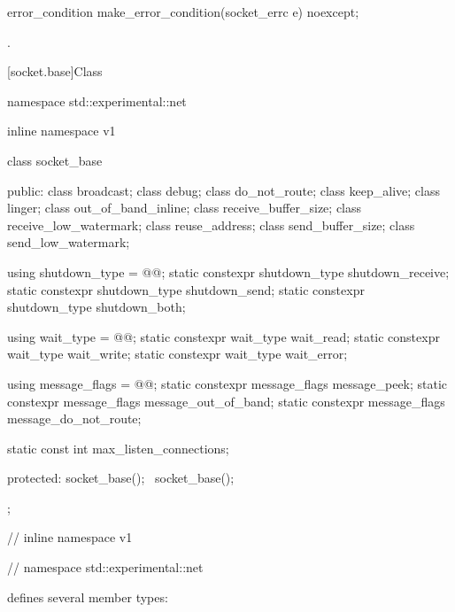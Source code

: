 %
%
\begin{itemdecl}
error_condition make_error_condition(socket_errc e) noexcept;
\end{itemdecl}

\begin{itemdescr}
\pnum
\returns {}.
\end{itemdescr}



%
[socket.base]{Class }

\begin{codeblock}
namespace std::experimental::net {
inline namespace v1 {

  class socket_base
  {
  public:
    class broadcast;
    class debug;
    class do_not_route;
    class keep_alive;
    class linger;
    class out_of_band_inline;
    class receive_buffer_size;
    class receive_low_watermark;
    class reuse_address;
    class send_buffer_size;
    class send_low_watermark;

    using shutdown_type = @@;
    static constexpr shutdown_type shutdown_receive;
    static constexpr shutdown_type shutdown_send;
    static constexpr shutdown_type shutdown_both;

    using wait_type = @@;
    static constexpr wait_type wait_read;
    static constexpr wait_type wait_write;
    static constexpr wait_type wait_error;

    using message_flags = @@;
    static constexpr message_flags message_peek;
    static constexpr message_flags message_out_of_band;
    static constexpr message_flags message_do_not_route;

    static const int max_listen_connections;

  protected:
    socket_base();
    ~socket_base();
  };

} // inline namespace v1
} // namespace std::experimental::net
\end{codeblock}

\pnum
{} defines several member types:

